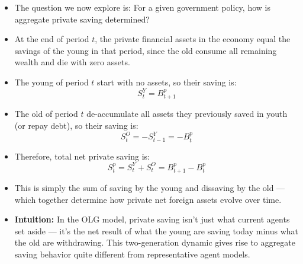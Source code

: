 \documentclass[12pt]{article}
\begin{document}
\begin{itemize}
\item The question we now explore is: For a given government policy, how is aggregate private saving determined?

\item At the end of period \( t \), the private financial assets in the economy equal the savings of the young in that period, since the old consume all remaining wealth and die with zero assets.

\item The young of period \( t \) start with no assets, so their saving is:
\[
S_t^Y = B_{t+1}^p \tag{21}
\]

\item The old of period \( t \) de-accumulate all assets they previously saved in youth (or repay debt), so their saving is:
\[
S_t^O = -S_{t-1}^Y = -B_t^p \tag{22}
\]

\item Therefore, total net private saving is:
\[
S_t^p = S_t^Y + S_t^O = B_{t+1}^p - B_t^p
\]

\item This is simply the sum of saving by the young and dissaving by the old — which together determine how private net foreign assets evolve over time.

\item \textbf{Intuition:} In the OLG model, private saving isn’t just what current agents set aside — it’s the net result of what the young are saving today minus what the old are withdrawing. This two-generation dynamic gives rise to aggregate saving behavior quite different from representative agent models.
\end{itemize}
\end{document}
